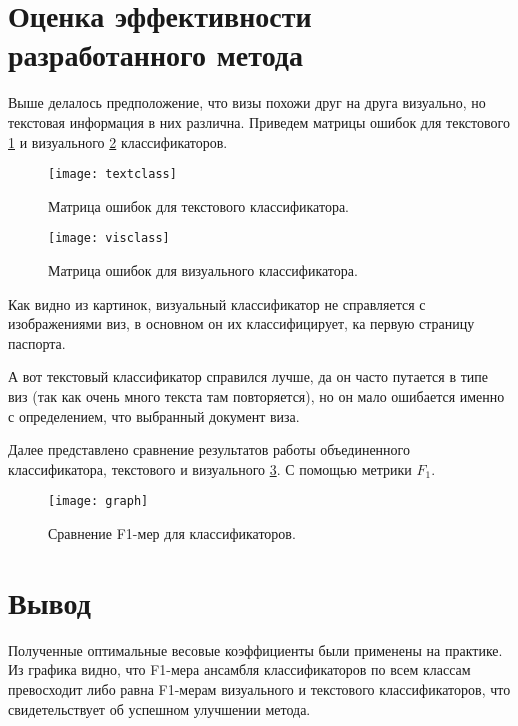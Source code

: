 \section{Оценка эффективности разработанного метода}

Выше делалось предположение, что визы похожи друг на друга визуально, но текстовая информация в них различна. Приведем матрицы ошибок для текстового \ref{img:textclass} и визуального \ref{img:visclass} классификаторов.

\begin{figure}[H]
	\centering
	\texttt{[image: textclass]}
	\caption{Матрица ошибок для текстового классификатора. }
	\label{img:textclass}
\end{figure}

\begin{figure}[H]
	\centering
	\texttt{[image: visclass]}
	\caption{Матрица ошибок для визуального классификатора. }
	\label{img:visclass}
\end{figure}

Как видно из картинок, визуальный классификатор не справляется с изображениями виз, в основном он их классифицирует, ка первую страницу паспорта.

А вот текстовый классификатор справился лучше, да он часто путается в типе виз (так как очень много текста там повторяется), но он мало ошибается именно с определением, что выбранный документ виза.

Далее представлено сравнение результатов работы объединенного классификатора, текстового и визуального \ref{img:graph}. С помощью метрики $F_1$.

\begin{figure}[H]
	\centering
	\texttt{[image: graph]}
	\caption{Сравнение F1-мер для классификаторов. }
	\label{img:graph}
\end{figure}

\section{Вывод}

Полученные оптимальные весовые коэффициенты были применены на практике. Из графика видно, что F1-мера ансамбля классификаторов по всем классам превосходит либо равна F1-мерам визуального и текстового классификаторов, что свидетельствует об успешном улучшении метода.
